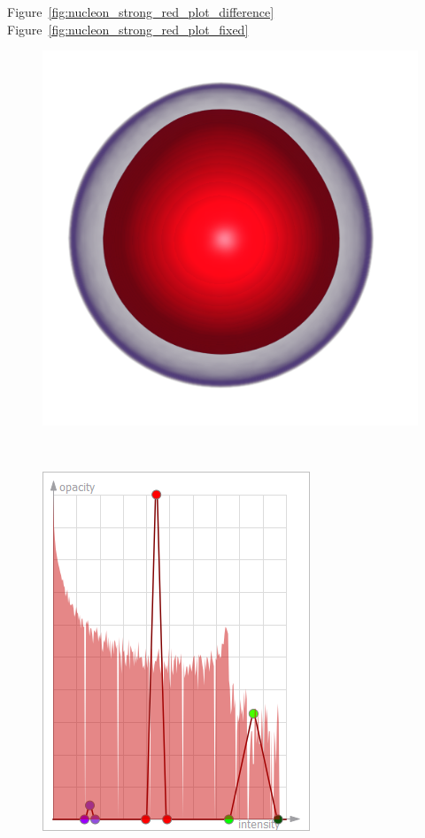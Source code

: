 Figure~\ref{fig:nucleon_strong_red_plot_difference}
Figure~\ref{fig:nucleon_strong_red_plot_fixed}

\begin{figure}
	\centering
	\begin{minipage}{.35\textwidth}
		\includegraphics[width=1\linewidth]{images/nucleon_strong_red}
	\end{minipage}~
	\begin{minipage}{.2\textwidth}
		\includegraphics[width=1\linewidth]{images/tf_nucleon_strong_red}	

\end{minipage}
\end{figure}
